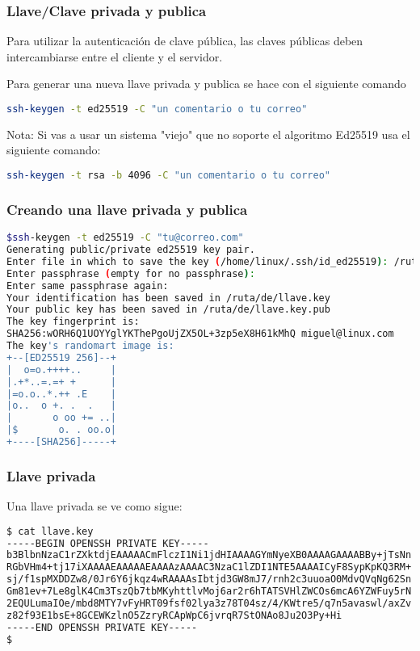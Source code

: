 \begin{frame}[fragile]
  \frametitle{Llave/Clave privada y publica}

  Para utilizar la autenticación de clave pública,
  las claves públicas deben intercambiarse entre el cliente y el servidor.

  \vspace{\baselineskip}
  Para generar una nueva llave privada y publica se hace con el siguiente
  comando
  \vspace{\baselineskip}
  \begin{lstlisting}[language=Bash]
ssh-keygen -t ed25519 -C "un comentario o tu correo"
  \end{lstlisting}
  
  \begin{alertblock}{Nota:}
    Si vas a usar un sistema "viejo" que no soporte el algoritmo Ed25519 usa
    el siguiente comando:

    \begin{lstlisting}[language=Bash]
ssh-keygen -t rsa -b 4096 -C "un comentario o tu correo"
    \end{lstlisting}
  \end{alertblock}
\end{frame}

\begin{frame}[fragile]
  \frametitle{Creando una llave privada y publica}
  \begin{lstlisting}[language=Bash,basicstyle={\footnotesize\ttfamily}]
$ssh-keygen -t ed25519 -C "tu@correo.com"
Generating public/private ed25519 key pair.
Enter file in which to save the key (/home/linux/.ssh/id_ed25519): /ruta/de/llave.key      
Enter passphrase (empty for no passphrase): 
Enter same passphrase again: 
Your identification has been saved in /ruta/de/llave.key
Your public key has been saved in /ruta/de/llave.key.pub
The key fingerprint is:
SHA256:wORH6Q1UOYYglYKThePgoUjZX5OL+3zp5eX8H61kMhQ miguel@linux.com
The key's randomart image is:
+--[ED25519 256]--+
|  o=o.++++..     |
|.+*..=.=+ +      |
|=o.o..*.++ .E    |
|o..  o +. .  .   |
|       o oo += ..|
|$       o. . oo.o|
+----[SHA256]-----+
  \end{lstlisting}
\end{frame}

\begin{frame}[fragile]
  \frametitle{Llave privada}

  Una llave privada se ve como sigue:

  \vspace{\baselineskip}
  \begin{lstlisting}[language=Bash,basicstyle={\footnotesize\ttfamily}]
$ cat llave.key
-----BEGIN OPENSSH PRIVATE KEY-----
b3BlbnNzaC1rZXktdjEAAAAACmFlczI1Ni1jdHIAAAAGYmNyeXB0AAAAGAAAABBy+jTsNn
RGbVHm4+tj17iXAAAAEAAAAAEAAAAzAAAAC3NzaC1lZDI1NTE5AAAAICyF8SypKpKQ3RM+
sj/f1spMXDDZw8/0Jr6Y6jkqz4wRAAAAsIbtjd3GW8mJ7/rnh2c3uuoaO0MdvQVqNg62Sn
Gm81ev+7Le8glK4Cm3TszQb7tbMKyhttlvMoj6ar2r6hTATSVHlZWCOs6mcA6YZWFuy5rN
2EQULumaIOe/mbd8MTY7vFyHRT09fsf02lya3z78T04sz/4/KWtre5/q7n5avaswl/axZv
z82f93E1bsE+8GCEWKzlnO5ZzryRCApWpC6jvrqR7StONAo8Ju2O3Py+Hi
-----END OPENSSH PRIVATE KEY-----
$
  \end{lstlisting}
\end{frame}

